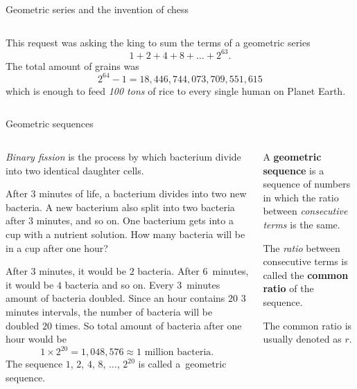 \documentclass[9pt,aspectratio=169]{beamer}
\begin{document}
\begin{frame}{Geometric series and the invention of chess}
\begin{columns}[T]
\begin{column}{0.5\textwidth}
      \begin{example}
        This request was asking the king to sum the terms of a geometric series
        \[ 1 + 2 + 4 + 8 + \ldots + 2^{63}. \]
        The total amount of grains was
        \[ 2^{64} - 1 = 18{,}446{,}744{,}073{,}709{,}551{,}615 \]which is enough to feed \emph{100 tons} of rice to every single human on Planet Earth.
      \end{example}
    \end{column}
  \end{columns}
\end{frame}

\begin{frame}{Geometric sequences}
  \begin{columns}[T]
    \begin{column}{0.5\textwidth}
      \emph{Binary fission} is the process by which bacterium divide into two identical daughter cells.

      \begin{problem}
        After $3$ minutes of life, a bacterium divides into two new bacteria. A new bacterium also split into two bacteria after $3$ minutes, and so on. One bacterium gets into a cup with a nutrient solution. How many bacteria will be in a cup after one hour?
      \end{problem}

      After $3$ minutes, it would be $2$ bacteria. After $6$~minutes, it would be $4$ bacteria and so on. Every $3$~minutes amount of bacteria doubled. Since an hour contains $20$ $3$ minutes intervals, the number of bacteria will be doubled $20$ times. So total amount of bacteria after one hour would be 
      \[ 1 \times 2^{20} = 1{,}048{,}576 \approx 1 \text{ million bacteria.} \]
      The sequence $1$, $2$, $4$, $8$, $\ldots$, $2^{20}$ is called a~geometric sequence.
    \end{column}
    \begin{column}{0.5\textwidth}
      \begin{definition}
        A \textbf{geometric sequence} is a sequence of numbers in which the ratio between \emph{consecutive terms} is the same.
        
        The \emph{ratio} between consecutive terms is called the \textbf{common ratio} of the sequence. 
      \end{definition}
      The common ratio is usually denoted as $r$.


\end{column}
\end{columns}
\end{frame}
\end{document}
